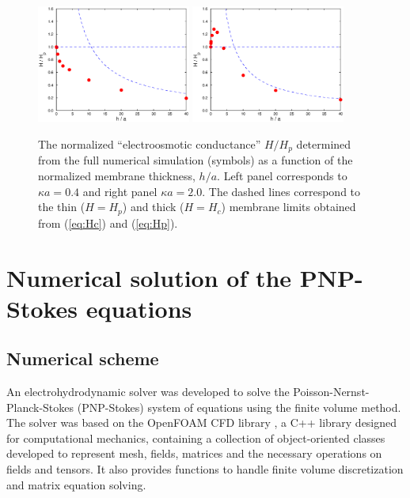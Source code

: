 \begin{figure}[ht]
\centering
\includegraphics[width=0.45\textwidth]{zero_thickness/figure3a.eps}
\includegraphics[width=0.45\textwidth]{zero_thickness/figure3b.eps}
\caption{The normalized ``electroosmotic conductance'' $H/H_p$ determined from the full 
numerical simulation (symbols) as a function of the normalized membrane thickness, $h/a$. Left panel corresponds to $\kappa a = 0.4$ and right panel $\kappa a = 2.0$.
The dashed lines correspond to the thin ($H=H_p$) and thick 
($H=H_c$) membrane limits obtained from (\ref{eq:Hc}) and (\ref{eq:Hp}).}
\label{fig:flowConduc}
\end{figure}

\section{Numerical solution of the PNP-Stokes equations}\label{sec:numerical}
\subsection{Numerical scheme}
An electrohydrodynamic solver was developed to solve the Poisson-Nernst-Planck-Stokes (PNP-Stokes) system of equations using the finite volume method. The solver was based on the OpenFOAM CFD library \cite{OPENFOAM}, a C++ library designed for computational mechanics,
containing a collection of object-oriented classes developed to represent mesh, fields, matrices and the necessary operations on fields and tensors. It also provides functions to handle finite volume discretization and matrix equation solving. 

